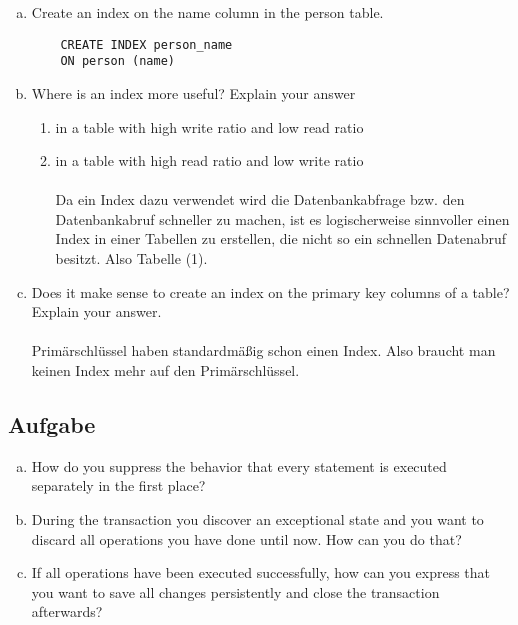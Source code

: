 \documentclass[11pt,a4paper,DIV=9]{scrartcl}
\newcounter{temp}
\newcommand{\aufgabe}[1]{
  \setcounter{temp}{\value{subsection}}
  \setcounter{subsection}{#1}
  \addtocounter{subsection}{-1}
  \subsection{Aufgabe}
  \setcounter{subsection}{\value{temp}}
}
\begin{document}
    \begin{enumerate}[a.]
    \item Create an index on the name column in the person table.
    \begin{lstlisting}
    CREATE INDEX person_name
    ON person (name)
    \end{lstlisting}
    \item Where is an index more useful? Explain your answer
    \begin{enumerate}[1.]
    \item in a table with high write ratio and low read ratio
    \item in a table with high read ratio and low write ratio
    \\\\Da ein Index dazu verwendet wird die Datenbankabfrage bzw. den Datenbankabruf schneller zu machen, ist es logischerweise sinnvoller einen Index in einer Tabellen zu erstellen, die nicht so ein schnellen Datenabruf besitzt. Also Tabelle (1).
    \end{enumerate}
    \item Does it make sense to create an index on the primary key columns of a table? Explain your answer. \\\\
    Prim\"arschl\"ussel haben standardm\"a{\ss}ig schon einen Index. Also braucht man keinen Index mehr auf den Prim\"arschl\"ussel.
    \end{enumerate}
    \aufgabe{4}
      \begin{enumerate}[a.]
      \item How do you suppress the behavior that every statement is executed separately in the first place?
      \item During the transaction you discover an exceptional state and you want to discard all operations you have done until now. How can you do that?
      \item If all operations have been executed successfully, how can you express that you want to save all changes persistently and close the transaction afterwards? 
      \end{enumerate}
\end{document}
